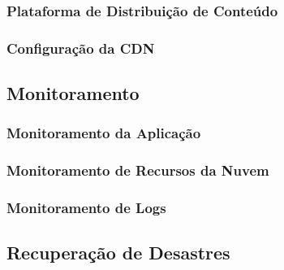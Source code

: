 \subsubsection{Plataforma de Distribuição de Conteúdo}

\subsubsection{Configuração da CDN}

\subsection{Monitoramento}

\subsubsection{Monitoramento da Aplicação}

\subsubsection{Monitoramento de Recursos da Nuvem}

\subsubsection{Monitoramento de Logs}


\subsection{Recuperação de Desastres}


